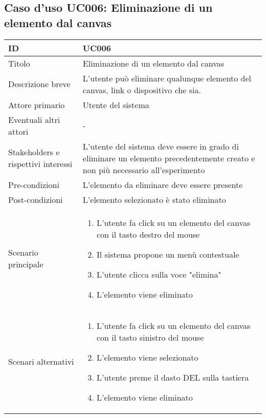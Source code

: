 \documentclass[../../main.tex]{subfiles}
\begin{document}
\subsection{Caso d’uso UC006: Eliminazione di un elemento dal canvas}
\begin{tabularx}{150mm}{|l|X|}
    \hline
    ID                                  & \textbf{UC006}\\
    \hline
    Titolo                              & Eliminazione di un elemento dal canvas\\
    \hline
    Descrizione breve                   & L'utente può eliminare qualunque elemento del canvas, link o dispositivo che sia.   \\
    \hline
    Attore primario                     & Utente del sistema   \\
    \hline
    Eventuali altri attori              & -   \\
    \hline
    Stakeholders e rispettivi interessi & L'utente del sistema deve essere in grado di eliminare un elemento precedentemente creato e non più necessario all'esperimento   \\
    \hline
    Pre-condizioni                      & L'elemento da eliminare deve essere presente   \\
    \hline
    Post-condizioni                     & L'elemento selezionato è stato eliminato   \\
    \hline
    Scenario principale                 & 
    \begin{enumerate}
        \item L'utente fa click su un elemento del canvas con il tasto destro del mouse
        \item Il sistema propone un menù contestuale
        \item L'utente clicca sulla voce "elimina"
        \item L'elemento viene eliminato
    \end{enumerate}
    \\
    \hline
    Scenari alternativi                 &
    \begin{enumerate}
        \item L'utente fa click su un elemento del canvas con il tasto sinistro del mouse
        \item L'elemento viene selezionato
        \item L'utente preme il dasto DEL sulla tastiera
        \item L'elemento viene eliminato
    \end{enumerate}

\end{tabularx}
\end{document}
